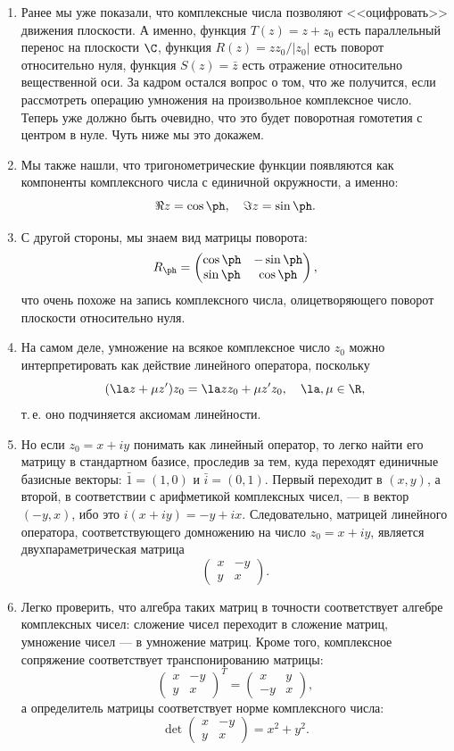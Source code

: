 \begin{enumerate}
\item Ранее мы уже показали, что комплексные числа позволяют <<оцифровать>> движения плоскости. А именно, функция $T(z)=z+z_0$ есть параллельный перенос на плоскости $\C$, функция $R(z) = zz_0/|z_0|$ есть поворот относительно нуля, функция $S(z)=\bar z$ есть отражение относительно вещественной оси. За кадром остался вопрос о том, что же получится, если рассмотреть операцию умножения на произвольное комплексное число. Теперь уже должно быть очевидно, что это будет поворотная гомотетия с центром в нуле. Чуть ниже мы это докажем.
\item Мы также нашли, что тригонометрические функции появляются как компоненты комплексного числа с единичной окружности, а именно:
$$
\Re z = \cos\ph,\quad \Im z=\sin\ph.
$$
\item С другой стороны, мы знаем вид матрицы поворота:
$$
R_\ph = \begin{pmatrix}
\cos\ph & -\sin\ph \\ \sin\ph & \cos\ph
\end{pmatrix},
$$
что очень похоже на запись комплексного числа, олицетворяющего поворот плоскости относительно нуля.
\item На самом деле, умножение на всякое комплексное число $z_0$ можно интерпретировать как действие линейного оператора, поскольку
$$
(\la z+\mu z')z_0 = \la zz_0 + \mu z'z_0,\quad \la,\mu\in\R,
$$
т.\,е. оно подчиняется аксиомам линейности.
\item Но если $z_0=x+iy$ понимать как линейный оператор, то легко найти его матрицу в стандартном базисе, проследив за тем, куда переходят единичные базисные векторы: $\bar 1=(1,0)$ и $\bar i=(0,1)$. Первый переходит в $(x,y)$, а второй, в соответствии с арифметикой комплексных чисел, --- в вектор $(-y,x)$, ибо это $i(x+iy)=-y+ix$. Следовательно, матрицей линейного оператора, соответствующего домножению на число $z_0=x+iy$, является двухпараметрическая матрица
$$
\begin{pmatrix}
x & -y \\ y & x
\end{pmatrix}.
$$
\item Легко проверить, что алгебра таких матриц в точности соответствует алгебре комплексных чисел: сложение чисел переходит в сложение матриц, умножение чисел --- в умножение матриц. Кроме того, комплексное сопряжение соответствует транспонированию матрицы:
$$
\begin{pmatrix}
x & -y \\ y & x
\end{pmatrix}^T =
\begin{pmatrix}
x & y \\ -y & x
\end{pmatrix},
$$
а определитель матрицы соответствует норме комплексного числа:
$$
\det \begin{pmatrix}
x & -y \\ y & x
\end{pmatrix} = 
x^2+y^2.
$$


\end{enumerate}
